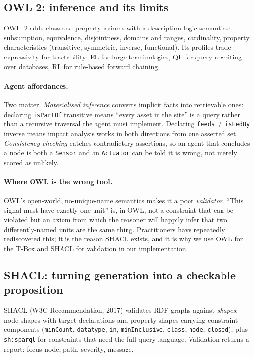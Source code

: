 \subsection{OWL 2: inference and its limits}

OWL~2 \cite{w3c2012owl} adds class and property axioms with a
description-logic semantics: subsumption, equivalence, disjointness, domains and
ranges, cardinality, property characteristics (transitive, symmetric, inverse,
functional). Its
profiles trade expressivity for tractability: EL for large terminologies, QL
for query rewriting over databases, RL for rule-based forward chaining.

\paragraph{Agent affordances.} Two matter. \emph{Materialised inference}
converts implicit facts into retrievable ones: declaring
\texttt{isPartOf} transitive means ``every asset in the site'' is a query rather
than a recursive traversal the agent must implement. Declaring
\texttt{feeds}~/~\texttt{isFedBy} inverse means impact analysis works in both
directions from one asserted set. \emph{Consistency checking} catches
contradictory assertions, so an agent that concludes a node is both a
\texttt{Sensor} and an \texttt{Actuator} can be told it is wrong, not merely
scored as unlikely.

\paragraph{Where OWL is the wrong tool.} OWL's open-world, no-unique-name
semantics makes it a poor \emph{validator}. ``This signal must have exactly one
unit'' is, in OWL, not a constraint that can be violated but an axiom from which
the reasoner will happily infer that two differently-named units are the same
thing. Practitioners have repeatedly rediscovered this; it is the reason SHACL
exists, and it is why we use OWL for the T-Box and SHACL for validation in our
implementation.

\subsection{SHACL: turning generation into a checkable proposition}
\label{sec:shacl}

SHACL \cite{knublauch2017shacl} (W3C Recommendation, 2017) validates RDF graphs
against \emph{shapes}:
node shapes with target declarations and property shapes carrying constraint
components (\texttt{minCount}, \texttt{datatype}, \texttt{in},
\texttt{minInclusive}, \texttt{class}, \texttt{node}, \texttt{closed}), plus
\texttt{sh:sparql} for constraints that need the full query language. Validation
returns a report: focus node, path, severity, message.


